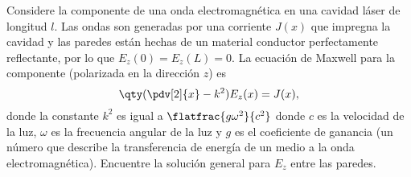 \vspace{1cm}
\begin{tcolorbox}[arc=0mm,boxrule=0pt,colframe=white,colback=lightgray!25]
	Considere la componente de una onda electromagnética en una cavidad láser de longitud $l$. Las ondas son generadas por una corriente $J(x)$ que impregna la cavidad y las paredes están hechas de un material conductor perfectamente reflectante, por lo que $E_z (0) = E_z (L) = 0$. La ecuación de Maxwell para la componente (polarizada en la dirección $z$) es
		$$ \qty(\pdv[2]{x} - k^2) E_z (x) = J(x), $$
	donde la constante $k^2$ es igual a $\flatfrac{g\omega ^2}{c^2}$ donde $c$ es la velocidad de la luz, $\omega$ es la frecuencia angular de la luz y $g$ es el coeficiente de ganancia (un número que describe la transferencia de energía de un medio a la onda electromagnética). Encuentre la solución general para $E_z$ entre las paredes.
\end{tcolorbox}










































